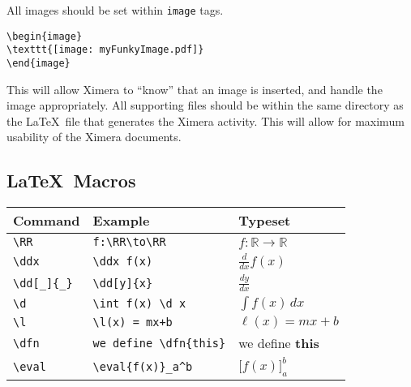 \documentclass{article}
\newcommand{\RR}{\mathbb R}
\renewcommand{\d}{\,d}
\newcommand{\dd}[2][]{\frac{d #1}{d #2}}
\renewcommand{\l}{\ell}
\newcommand{\ddx}{\frac{d}{dx}}
\newcommand{\dfn}{\textbf}
\newcommand{\eval}[1]{\bigg[ #1 \bigg]}
\begin{document}
All images should be set within \verb|image| tags.
\begin{verbatim}
\begin{image}
\texttt{[image: myFunkyImage.pdf]}
\end{image}
\end{verbatim}
This will allow Ximera to ``know'' that an image is inserted, and
handle the image appropriately. All supporting files should be within
the same directory as the \LaTeX\ file that generates the Ximera
activity. This will allow for maximum usability of the Ximera
documents.

\subsection*{\LaTeX\ Macros}

\renewcommand{\arraystretch}{2}
\begin{tabular*}{1.0\textwidth}{lll}
\hline
Command & Example & Typeset \\
\hline
\verb|\RR| & \verb|f:\RR\to\RR| & $f:\RR\to\RR$\\ 
\verb|\ddx| & \verb|\ddx f(x)| & $\ddx f(x)$\\
\verb|\dd[_]{_}| & \verb|\dd[y]{x}| & $\dd[y]{x}$ \\
\verb|\d | & \verb|\int f(x) \d x| & $\int f(x) \d x$\\
\verb|\l| & \verb|\l(x) = mx+b| & $\l(x) = mx +b$\\
\verb|\dfn| & \verb|we define \dfn{this}| & we define \dfn{this}\\
\verb|\eval| & \verb|\eval{f(x)}_a^b| & $\eval{f(x)}_a^b$
\end{tabular*}
\end{document}
